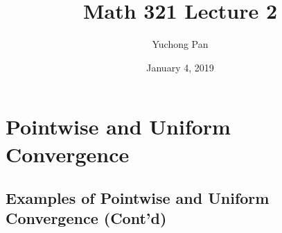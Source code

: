 \documentclass[letterpaper, reqno,11pt]{article}
\begin{document}
\title{Math 321 Lecture 2}
\author{Yuchong Pan}
\date{January 4, 2019}
\newtheorem{thm}{Theorem}
\newtheorem{defn}{Definition}
\newtheorem{exs}{Exercise}
\newtheorem{remark}{Remark}
\newtheorem{claim}{Claim}
\maketitle
%

\section{Pointwise and Uniform Convergence}

\subsection{Examples of Pointwise and Uniform Convergence (Cont'd)}
\end{document}
